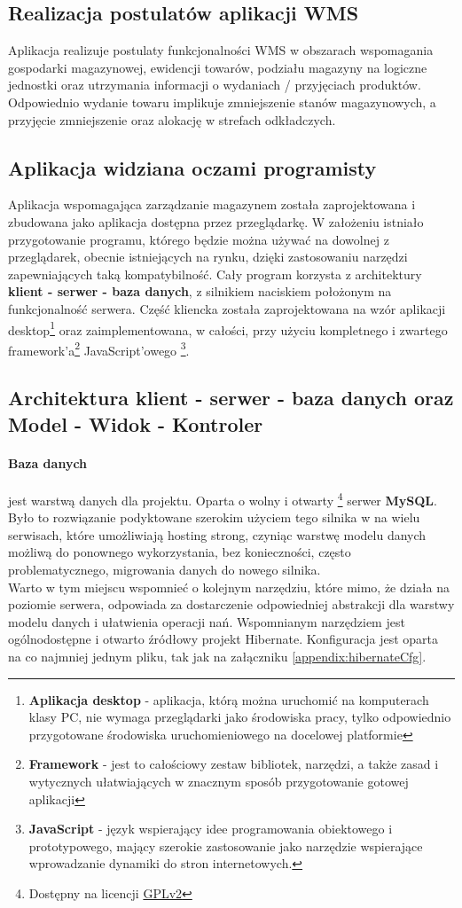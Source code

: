 	\subsection{Realizacja postulatów aplikacji WMS}
		Aplikacja realizuje postulaty funkcjonalności WMS w obszarach wspomagania gospodarki magazynowej,
		ewidencji towarów, podziału magazyny na logiczne jednostki oraz utrzymania informacji
		o wydaniach / przyjęciach produktów. Odpowiednio wydanie towaru implikuje zmniejszenie stanów
		magazynowych, a przyjęcie zmniejszenie oraz alokację w strefach odkładczych.
	\subsection{Aplikacja widziana oczami programisty}
		Aplikacja wspomagająca zarządzanie magazynem została zaprojektowana i zbudowana jako aplikacja
		dostępna przez przeglądarkę. W założeniu istniało przygotowanie programu, którego będzie można
		używać na dowolnej z przeglądarek, obecnie istniejących na rynku, dzięki zastosowaniu
		narzędzi zapewniających taką kompatybilność. Cały program korzysta z architektury
		\textbf{klient - serwer - baza danych}, z silnikiem naciskiem położonym na funkcjonalność
		serwera. Część kliencka została zaprojektowana na wzór aplikacji desktop\footnote{
			\textbf{Aplikacja desktop} - aplikacja, którą można uruchomić na komputerach klasy PC,
			nie wymaga przeglądarki jako środowiska pracy, tylko odpowiednio przygotowane
			środowiska uruchomieniowego na docelowej platformie		
		} oraz zaimplementowana, w całości, przy użyciu kompletnego i zwartego framework'a\footnote{
			\textbf{Framework} - jest to całościowy zestaw bibliotek, narzędzi, a także zasad i wytycznych
			ułatwiających w znacznym sposób przygotowanie gotowej aplikacji		
		} JavaScript'owego \footnote{
			\textbf{JavaScript} - język wspierający idee programowania obiektowego i prototypowego, mający
			szerokie zastosowanie jako narzędzie wspierające wprowadzanie dynamiki do stron
			internetowych. 		
		}.
	\subsection{Architektura klient - serwer - baza danych oraz Model - Widok - Kontroler}
		\paragraph{Baza danych} jest warstwą danych dla projektu. Oparta o wolny i otwarty \footnote{
			Dostępny na licencji \href{http://www.gnu.org/licenses/old-licenses/gpl-2.0.html}{GPLv2}
		}
		serwer \textbf{MySQL}. Było to rozwiązanie podyktowane szerokim użyciem tego silnika w 
		na wielu serwisach, które umożliwiają hosting strong, czyniąc warstwę modelu danych możliwą
		do ponownego wykorzystania, bez konieczności, często problematycznego, migrowania danych do
		nowego silnika. \\
		Warto w tym miejscu wspomnieć o kolejnym narzędziu, które mimo, że działa na poziomie serwera, 
		odpowiada za dostarczenie odpowiedniej abstrakcji dla warstwy modelu danych i ułatwienia
		operacji nań. Wspomnianym narzędziem jest ogólnodostępne i otwarto źródłowy projekt Hibernate. 
		Konfiguracja jest oparta na co najmniej jednym pliku, tak jak na załączniku \ref{appendix:hibernateCfg}. 
